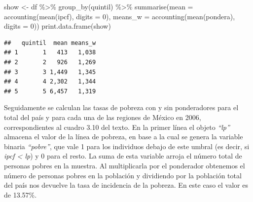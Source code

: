 \documentclass[
]{book}
\newenvironment{Shaded}{\begin{snugshade}}{\end{snugshade}}
\newcommand{\AttributeTok}[1]{\textcolor[rgb]{0.77,0.63,0.00}{#1}}
\newcommand{\CommentTok}[1]{\textcolor[rgb]{0.56,0.35,0.01}{\textit{#1}}}
\newcommand{\DecValTok}[1]{\textcolor[rgb]{0.00,0.00,0.81}{#1}}
\newcommand{\DocumentationTok}[1]{\textcolor[rgb]{0.56,0.35,0.01}{\textbf{\textit{#1}}}}
\newcommand{\FloatTok}[1]{\textcolor[rgb]{0.00,0.00,0.81}{#1}}
\newcommand{\FunctionTok}[1]{\textcolor[rgb]{0.00,0.00,0.00}{#1}}
\newcommand{\NormalTok}[1]{#1}
\newcommand{\OtherTok}[1]{\textcolor[rgb]{0.56,0.35,0.01}{#1}}
\newcommand{\SpecialCharTok}[1]{\textcolor[rgb]{0.00,0.00,0.00}{#1}}
\begin{document}
\begin{Shaded}
\begin{Highlighting}[]
\NormalTok{show }\OtherTok{\textless{}{-}}\NormalTok{ df }\SpecialCharTok{\%\textgreater{}\%} \FunctionTok{group\_by}\NormalTok{(quintil) }\SpecialCharTok{\%\textgreater{}\%} \FunctionTok{summarise}\NormalTok{(}\AttributeTok{mean =} \FunctionTok{accounting}\NormalTok{(}\FunctionTok{mean}\NormalTok{(ipcf), }\AttributeTok{digits =} \DecValTok{0}\NormalTok{),}
                                               \AttributeTok{means\_w =} \FunctionTok{accounting}\NormalTok{(}\FunctionTok{mean}\NormalTok{(pondera), }\AttributeTok{digits =} \DecValTok{0}\NormalTok{))}
\FunctionTok{print.data.frame}\NormalTok{(show)}
\end{Highlighting}
\end{Shaded}

\begin{verbatim}
##   quintil  mean means_w
## 1       1   413   1,038
## 2       2   926   1,269
## 3       3 1,449   1,345
## 4       4 2,302   1,344
## 5       5 6,457   1,319
\end{verbatim}

Seguidamente se calculan las tasas de pobreza con y sin ponderadores para el total del país y para cada una de las regiones de México en 2006, correspondientes al cuadro 3.10 del texto. En la primer línea el objeto \emph{``lp''} almacena el valor de la línea de pobreza, en base a la cual se genera la variable binaria \emph{``pobre''}, que vale 1 para los individuos debajo de este umbral (es decir, si \emph{ipcf \textless{} lp}) y 0 para el resto. La suma de esta variable arroja el número total de personas pobres en la muestra. Al multiplicarla por el ponderador obtenemos el número de personas pobres en la población y dividiendo por la población total del país nos devuelve la tasa de incidencia de la pobreza. En este caso el valor es de 13.57\%.

\begin{Shaded}
\end{Shaded}
\end{document}
